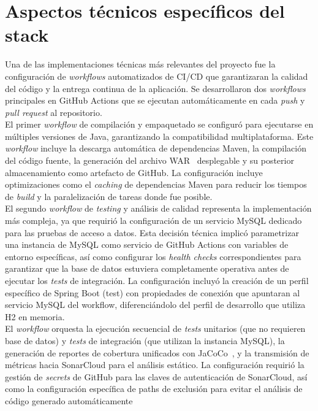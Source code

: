\section{Aspectos técnicos específicos del stack}\label{aspectos-terncicos-del-stack}
Una de las implementaciones técnicas más relevantes del proyecto fue la configuración de \emph{workflows} automatizados de CI/CD que garantizaran la calidad del código y la entrega continua de la aplicación. Se desarrollaron dos \emph{workflows} principales en GitHub Actions que se ejecutan automáticamente en cada \emph{push} y \emph{pull request} al repositorio.\\
El primer \emph{workflow} de compilación y empaquetado se configuró para ejecutarse en múltiples versiones de Java, garantizando la compatibilidad multiplataforma. Este \emph{workflow} incluye la descarga automática de dependencias Maven, la compilación del código fuente, la generación del archivo WAR~\cite{war} desplegable y su posterior almacenamiento como artefacto de GitHub. La configuración incluye optimizaciones como el \emph{caching} de dependencias Maven para reducir los tiempos de \emph{build} y la paralelización de tareas donde fue posible.\\
El segundo \emph{workflow} de \emph{testing} y análisis de calidad representa la implementación más compleja, ya que requirió la configuración de un servicio MySQL dedicado para las pruebas de acceso a datos. Esta decisión técnica implicó parametrizar una instancia de MySQL como servicio de GitHub Actions con variables de entorno específicas, así como configurar los \emph{health checks} correspondientes para garantizar que la base de datos estuviera completamente operativa antes de ejecutar los \emph{tests} de integración. La configuración incluyó la creación de un perfil específico de Spring Boot (test) con propiedades de conexión que apuntaran al servicio MySQL del workflow, diferenciándolo del perfil de desarrollo que utiliza H2 en memoria.\\
El \emph{workflow} orquesta la ejecución secuencial de \emph{tests} unitarios (que no requieren base de datos) y \emph{tests} de integración (que utilizan la instancia MySQL), la generación de reportes de cobertura unificados con JaCoCo~\cite{jacoco}, y la transmisión de métricas hacia SonarCloud para el análisis estático. La configuración requirió la gestión de \emph{secrets} de GitHub para las claves de autenticación de SonarCloud, así como la configuración específica de paths de exclusión para evitar el análisis de código generado automáticamente


